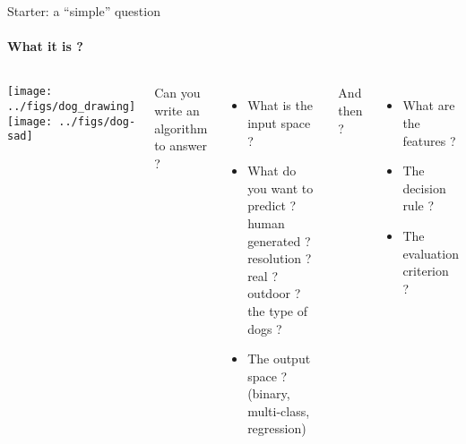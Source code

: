 \begin{frame}{Starter: a ``simple'' question}
  \framesubtitle{What it is ?}
    \begin{columns}
      \begin{center}
        \texttt{[image: ../figs/dog\_drawing]}
        \\[3ex]\pause
        \texttt{[image: ../figs/dog-sad]}\pause
      \end{center}
      Can you write an algorithm to answer ? \pause
      \begin{itemize}
      \item What is the input space ? 
      \item What do you want to predict ? \\  human generated ? resolution ? 
        real ? outdoor ? the type of dogs ?
      \item The output space ? (binary, multi-class, regression)
      \end{itemize}
      And then ?\pause
      \begin{itemize}
      \item What are the features ? 
      \item The decision rule ? 
      \item The evaluation criterion ? 
      \end{itemize}
    \end{columns}
  \end{frame}


